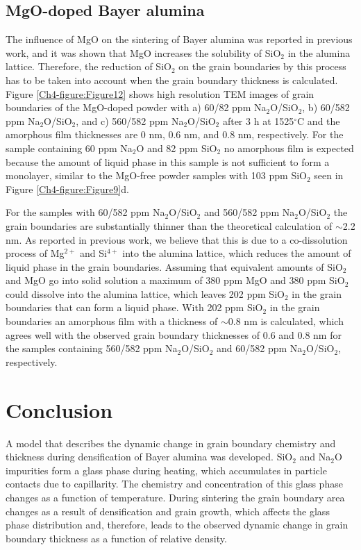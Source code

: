 \subsection{MgO-doped Bayer alumina}
The influence of MgO on the sintering of Bayer alumina was reported in previous work, and it was shown that MgO increases the solubility of SiO$_{2}$ in the alumina lattice. Therefore, the reduction of SiO$_{2}$ on the grain boundaries by this process has to be taken into account when the grain boundary thickness is calculated. Figure \ref{Ch4-figure:Figure12} shows high resolution TEM images of grain boundaries of the MgO-doped powder with a) 60/82 ppm Na$_{2}$O/SiO$_{2}$, b) 60/582 ppm Na$_{2}$O/SiO$_{2}$, and c) 560/582 ppm Na$_{2}$O/SiO$_{2}$ after 3 h at 1525$^{\circ}$C and the amorphous film thicknesses are 0 nm, 0.6 nm, and 0.8 nm, respectively. For the sample containing 60 ppm Na$_{2}$O and 82 ppm SiO$_{2}$ no amorphous film is expected because the amount of liquid phase in this sample is not sufficient to form a monolayer, similar to the MgO-free powder samples with 103 ppm SiO$_{2}$ seen in Figure \ref{Ch4-figure:Figure9}d. 

For the samples with 60/582 ppm Na$_{2}$O/SiO$_{2}$ and 560/582 ppm Na$_{2}$O/SiO$_{2}$ the grain boundaries are substantially thinner than the theoretical calculation of $\sim$2.2 nm. As reported in previous work, we believe that this is due to a co-dissolution process of Mg$^{2+}$ and Si$^{4+}$ into the alumina lattice, which reduces the amount of liquid phase in the grain boundaries. Assuming that equivalent amounts of SiO$_{2}$ and MgO go into solid solution a maximum of 380 ppm MgO and 380 ppm SiO$_{2}$ could dissolve into the alumina lattice, which leaves 202 ppm SiO$_{2}$ in the grain boundaries that can form a liquid phase. With 202 ppm SiO$_{2}$ in the grain boundaries an amorphous film with a thickness of $\sim$0.8 nm is calculated, which agrees well with the observed grain boundary thicknesses of 0.6 and 0.8 nm for the samples containing 560/582 ppm Na$_{2}$O/SiO$_{2}$ and 60/582 ppm Na$_{2}$O/SiO$_{2}$, respectively.

\section{Conclusion}
A model that describes the dynamic change in grain boundary chemistry and thickness during densification of Bayer alumina was developed. SiO$_{2}$ and Na$_{2}$O impurities form a glass phase during heating, which accumulates in particle contacts due to capillarity. The chemistry and concentration of this glass phase changes as a function of temperature. During sintering the grain boundary area changes as a result of densification and grain growth, which affects the glass phase distribution and, therefore, leads to the observed dynamic change in grain boundary thickness as a function of relative density. 

